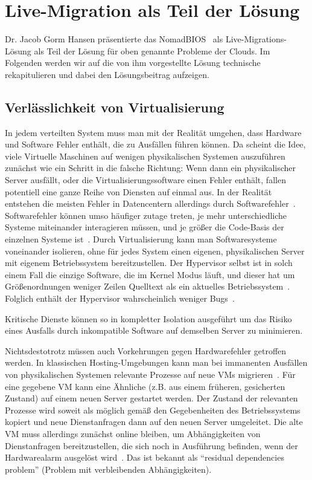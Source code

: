 \section{Live-Migration als Teil der Lösung}
\label{sec:livemigration}
Dr. Jacob Gorm Hansen präsentierte das NomadBIOS~\cite{needed} als
Live-Migrations-Lösung als Teil der Lösung für oben genannte
Probleme der Clouds. Im Folgenden werden wir auf die von ihm
vorgestellte Lösung technische rekapitulieren und dabei den
Lösungsbeitrag aufzeigen.

\subsection{Verlässlichkeit von Virtualisierung}
In jedem verteilten System muss man mit der Realität umgehen, dass
Hardware und Software Fehler enthält, die zu Ausfällen führen
können. Da scheint die Idee, viele Virtuelle Maschinen auf wenigen
physikalischen Systemen auszuführen zunächst wie ein Schritt in die
falsche Richtung: Wenn dann ein physikalischer Server ausfällt, oder
die Virtualisierungssoftware einen Fehler enthält, fallen potentiell
eine ganze Reihe von Diensten auf einmal aus. In der Realität
entstehen die meisten Fehler in Datencentern allerdings durch
Softwarefehler~\cite{tanenbaum1992modern}. Softwarefehler können umso
häufiger zutage treten, je mehr unterschiedliche Systeme miteinander
interagieren müssen, und je größer die Code-Basis der einzelnen
Systeme ist~\cite{zellerprograms}. Durch Virtualisierung kann man
Softwaresysteme voneinander isolieren, ohne für jedes System einen
eigenen, physikalischen Server mit eigenem Betriebssystem
bereitzustellen. Der Hypervisor selbst ist in solch einem Fall die
einzige Software, die im Kernel Modus läuft, und dieser hat um
Größenordnungen weniger Zeilen Quelltext als ein aktuelles
Betriebssystem~\cite{tanenbaum1992modern}. Folglich enthält der
Hypervisor wahrscheinlich weniger Bugs~\cite{zellerprograms}.

Kritische Dienste können so in kompletter Isolation ausgeführt um das
Risiko eines Ausfalls durch inkompatible Software auf demselben Server
zu minimieren.

Nichtsdestotrotz müssen auch Vorkehrungen gegen Hardwarefehler
getroffen werden. In klassischen Hosting-Umgebungen kann man bei
immanenten Ausfällen von physikalischen Systemen relevante Prozesse
auf neue VMs migrieren~\cite{hansen2004self}. Für eine gegebene VM
kann eine Ähnliche (z.B. aus einem früheren, gesicherten Zustand) auf
einem neuen Server gestartet werden. Der Zustand der relevanten
Prozesse wird soweit als möglich gemäß den Gegebenheiten des
Betriebssystems kopiert und neue Dienstanfragen dann auf den neuen
Server umgeleitet. Die alte VM muss allerdings zunächst online
bleiben, um Abhängigkeiten von Dienstanfragen bereitzustellen, die
sich noch in Ausführung befinden, wenn der Hardwarealarm ausgelöst
wird~\cite{clark2005live}. Das ist bekannt als "`residual
dependencies problem"' (Problem mit verbleibenden Abhängigkeiten).

